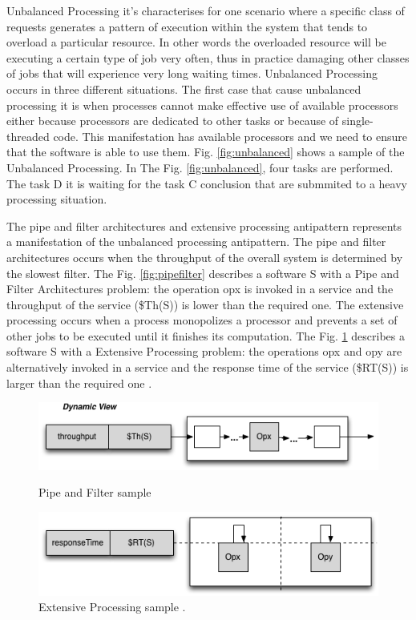 \documentclass{report}
\begin{document}
Unbalanced Processing it's characterises for one scenario where a specific class of requests generates a pattern of execution within the system that tends to overload a particular resource. In other words the overloaded resource will be executing a certain type of job very often, thus in practice damaging other classes
of jobs that will experience very long waiting times. Unbalanced Processing occurs in three different situations. The first case that cause unbalanced processing it is when processes cannot make effective use of available processors either because processors are dedicated to other tasks or because of single-threaded code. This manifestation has available processors and we need to ensure that the software is able to use them. Fig. \ref{fig:unbalanced}  shows a sample of the Unbalanced Processing. In The Fig. \ref{fig:unbalanced}, four tasks are performed. The task D it is waiting for the task C conclusion that are submmited to a heavy processing situation. 

The pipe and filter architectures  and extensive processing antipattern represents a manifestation of the unbalanced processing antipattern. The pipe and filter architectures occurs when the throughput of the overall system is determined by the slowest filter. The  Fig. \ref{fig:pipefilter} describes a software S with a Pipe and Filter Architectures problem:  the operation opx is invoked in a service  and the throughput of the service (\$Th(S)) is lower than the required one. The extensive processing occurs when a process monopolizes a processor and prevents a set of other jobs to be executed until it finishes its computation. The Fig. \ref{fig:extpro} describes a software S with a Extensive Processing problem: the operations opx and opy are alternatively invoked in a service and the response time of the service (\$RT(S)) is larger than the required one \cite{Vetoio2011}.

\begin{figure}[h]
\begin{minipage}{.5\textwidth}
\centering
\includegraphics[width=1\textwidth]{./images/pipe2.png}
\caption{Pipe and Filter sample \cite{Vetoio2011}}
\label{fig:pipefilter}
\end{minipage}
\begin{minipage}{.5\textwidth}
\centering
\includegraphics[width=1\textwidth]{./images/extpro.png}
\caption{Extensive Processing sample \cite{Vetoio2011}.}
\label{fig:extpro}
\end{minipage}
\end{figure}
\end{document}
